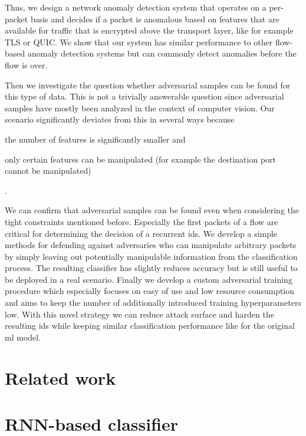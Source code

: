 \documentclass[conference]{IEEEtran}
\begin{document}
Thus, we design a network anomaly detection system that operates on a per-packet basis and decides if a packet is anomalous based on features that are available for traffic that is encrypted above the transport layer, like for example TLS or QUIC.
We show that our system has similar performance to other flow-based anomaly detection systems but can commonly detect anomalies before the flow is over. 

Then we investigate the question whether adversarial samples can be found for this type of data. This is not a trivially answerable question since adversarial samples have mostly been analyzed in the context of computer vision. Our scenario significantly deviates from this in several ways because \begin{enumerate*}
\item the number of features is significantly smaller and
\item only certain features can be manipulated (for example the destination port cannot be manipulated)
\end{enumerate*}.

We can confirm that adversarial samples can be found even when considering the tight constraints mentioned before. Especially the first packets of a flow are critical for determining the decision of a recurrent \gls{ids}. We develop a simple methods for defending against adversaries who can manipulate arbitrary packets by simply leaving out potentially manipulable information from the classification process. The resulting classifier has slightly reduces accuracy but is still useful to be deployed in a real scenario. Finally we develop a custom adversarial training procedure which especially focuses on easy of use and low resource consumption and aims to keep the number of additionally introduced training hyperparameters low. With this novel strategy we can reduce attack surface and harden the resulting \gls{ids} while keeping similar classification performance like for the original \gls{ml} model. 

\section{Related work}



\section{RNN-based classifier}
\end{document}
